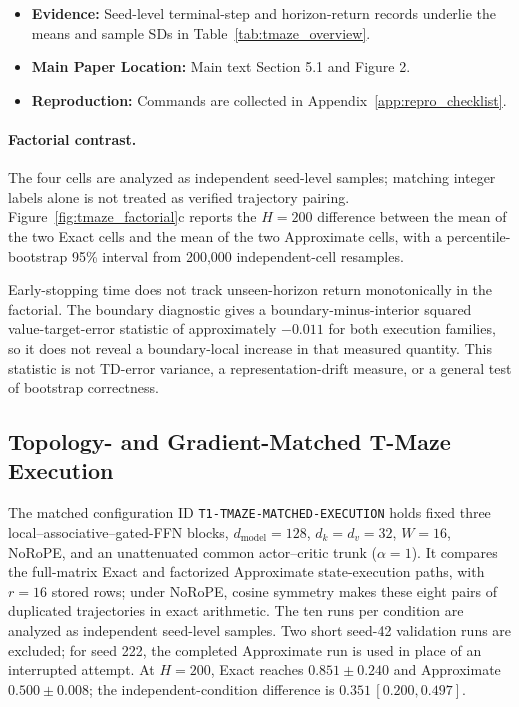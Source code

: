 \begin{itemize}
    \item \textbf{Evidence:} Seed-level terminal-step and horizon-return records underlie the means and sample SDs in Table~\ref{tab:tmaze_overview}.
    \item \textbf{Main Paper Location:} Main text Section 5.1 and Figure 2.
    \item \textbf{Reproduction:} Commands are collected in Appendix~\ref{app:repro_checklist}.
\end{itemize}

\paragraph{Factorial contrast.}
The four cells are analyzed as independent seed-level samples; matching integer labels alone is not treated as verified trajectory pairing. Figure~\ref{fig:tmaze_factorial}c reports the $H=200$ difference between the mean of the two Exact cells and the mean of the two Approximate cells, with a percentile-bootstrap 95\% interval from 200,000 independent-cell resamples.

Early-stopping time does not track unseen-horizon return monotonically in the factorial. The boundary diagnostic gives a boundary-minus-interior squared value-target-error statistic of approximately $-0.011$ for both execution families, so it does not reveal a boundary-local increase in that measured quantity. This statistic is not TD-error variance, a representation-drift measure, or a general test of bootstrap correctness.

\subsection{Topology- and Gradient-Matched T-Maze Execution}
\label{app:tmaze_matched_execution}
The matched configuration ID \texttt{T1-TMAZE-MATCHED-EXECUTION} holds fixed three local--associative--gated-FFN blocks, $d_{\mathrm{model}}=128$, $d_k=d_v=32$, $W=16$, NoRoPE, and an unattenuated common actor--critic trunk ($\alpha=1$). It compares the full-matrix Exact and factorized Approximate state-execution paths, with $r=16$ stored rows; under NoRoPE, cosine symmetry makes these eight pairs of duplicated trajectories in exact arithmetic. The ten runs per condition are analyzed as independent seed-level samples. Two short seed-42 validation runs are excluded; for seed 222, the completed Approximate run is used in place of an interrupted attempt. At $H=200$, Exact reaches $0.851\pm0.240$ and Approximate $0.500\pm0.008$; the independent-condition difference is $0.351\,[0.200,0.497]$.

